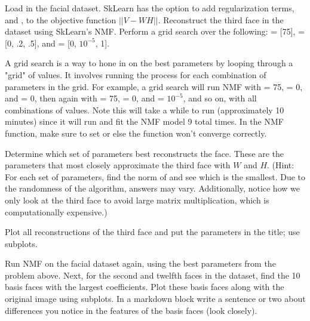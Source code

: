 \begin{problem}
Load in the facial dataset.
SkLearn has the option to add regularization terms,  and , to the objective function $||V-WH||$.
Reconstruct the third face in the dataset using SkLearn's NMF.
 Perform a grid search over the following:
 =  [75],  = [0, .2, .5], and  = [0, $10^{-5}$, 1].

A grid search is a way to hone in on the best parameters by looping through a "grid" of values. It involves running the process for each combination of parameters in the grid. For example, a grid search will run NMF with  =  75,  = 0, and  = 0, then again with   =  75,  = 0, and  =  $10^{-5}$, and so on, with all combinations of values. Note this will take a while to run (approximately 10 minutes) since it will run and fit the NMF model 9 total times. In the NMF function, make sure to set  or else the function won't converge correctly.

Determine which set of parameters best reconstructs the face. These are the parameters that most closely approximate the third face with $W$ and $H$. (Hint: For each set of parameters, find the norm of  and see which is the smallest. Due to the randomness of the algorithm, answers may vary. Additionally, notice how we only look at the third face to avoid large matrix multiplication, which is computationally expensive.)

Plot all reconstructions of the third face and put the parameters in the title; use subplots.
\end{problem}

\begin{problem}
Run NMF on the facial dataset again, using the best parameters from the problem above.
Next, for the second and twelfth faces in the dataset, find the 10 basis faces with the largest coefficients.
Plot these basis faces along with the original image using subplots.
In a markdown block write a sentence or two about differences you notice in the features of the basis faces (look closely).
\end{problem}
